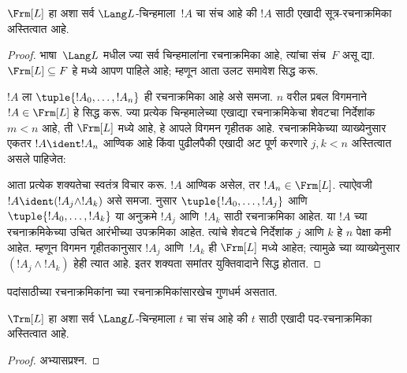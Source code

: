 \documentclass[../../../include/open-logic-section]{subfiles}
\begin{document}
\begin{thm}
$\Frm[L]$ हा अशा सर्व $\Lang L$-चिन्हमाला~$!A$ चा संच आहे की $!A$
साठी एखादी सूत्र-रचनाक्रमिका अस्तित्वात आहे.
\end{thm}

\begin{proof}
भाषा~$\Lang L$ मधील ज्या सर्व चिन्हमालांना रचनाक्रमिका आहे, त्यांचा
संच~$F$ असू द्या. $\Frm[L] \subseteq F$ हे
 मध्ये आपण पाहिले आहे; म्हणून आता उलट
समावेश सिद्ध करू.

$!A$ ला $\tuple{!A_0,\dotsc,!A_n}$ ही रचनाक्रमिका आहे असे समजा.
$n$ वरील प्रबल विगमनाने $!A \in \Frm[L]$ हे सिद्ध करू. ज्या प्रत्येक
चिन्हमालेच्या एखाद्या रचनाक्रमिकेचा शेवटचा निर्देशांक $m < n$ आहे, ती
$\Frm[L]$ मध्ये आहे, हे आपले विगमन गृहीतक आहे. रचनाक्रमिकेच्या
व्याख्येनुसार एकतर $!A \ident !A_n$ आण्विक आहे किंवा पुढीलपैकी एखादी
अट पूर्ण करणारे $j,k < n$ अस्तित्वात असले पाहिजेत:
\begin{enumerate}
\end{enumerate}
आता प्रत्येक शक्यतेचा स्वतंत्र विचार करू. $!A$ आण्विक असेल, तर
$!A_n \in \Frm[L]$. त्याऐवजी $!A \ident (!A_j \land !A_k)$ असे समजा.
%
%
 नुसार
$\tuple{!A_0,\dotsc,!A_j}$ आणि $\tuple{!A_0,\dotsc,!A_k}$ या अनुक्रमे
$!A_j$ आणि~$!A_k$ साठी रचनाक्रमिका आहेत. या $!A$ च्या
रचनाक्रमिकेच्या उचित आरंभीच्या उपक्रमिका आहेत. त्यांचे शेवटचे
निर्देशांक $j$ आणि $k$ हे $n$ पेक्षा कमी आहेत. म्हणून विगमन
गृहीतकानुसार $!A_j$ आणि~$!A_k$ ही
$\Frm[L]$ मध्ये आहेत; त्यामुळे च्या व्याख्येनुसार
$(!A_j \land !A_k)$ हेही त्यात आहे. इतर शक्यता समांतर युक्तिवादाने
सिद्ध होतात.
\end{proof}

पदांसाठीच्या रचनाक्रमिकांना च्या रचनाक्रमिकांसारखेच गुणधर्म
असतात.

\begin{prop}
$\Trm[L]$ हा अशा सर्व $\Lang L$-चिन्हमाला $t$ चा संच आहे की $t$
साठी एखादी पद-रचनाक्रमिका अस्तित्वात आहे.
\end{prop}

\begin{proof}
अभ्यासप्रश्न.
\end{proof}
\end{document}
